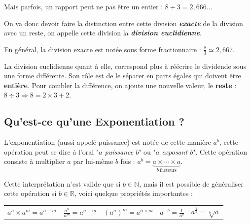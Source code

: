 \documentclass[a4paper, twoside]{article}
\begin{document}
			Mais parfois, un rapport peut ne pas être un entier : $ 8 \div 3 = 2,666...$
			
			On va donc devoir faire la distinction entre cette division
			\textit{\textbf{exacte}} de la division avec un reste, 
			on appelle cette division la \textbf{\textit{division euclidienne}}.
			
			En général, la division exacte est notée sous forme fractionnaire : $\frac{8}{3} \simeq 2,667$.
			
			La division euclidienne quant à elle, correspond plus à réécrire le dividende sous une forme différente. 
			Son rôle est de le séparer en parts égales qui doivent être \textbf{entière}. 
			Pour combler la différence, on ajoute une nouvelle valeur, 
			le \textbf{reste} : $ 8 \div 3 \Longrightarrow 8 = 2 \times 3 + 2$.

			\vspace{5 mm}

		\subsection*{Qu'est-ce qu'une Exponentiation ?}

			L'exponentiation (aussi appelé puissance) est notée de cette manière $a^b$, 
			cette opération peut se dire à l'oral "\textit{$a$ puissance $b$}" ou "\textit{$a$ exposant $b$}". 
			Cette opération consiste à multiplier $a$ par lui-même $b$ fois : 
			$a^b = \underbrace {a\times \cdots \times a} _{b\ \mathrm {facteurs}}$.

			\vspace{2 mm}

			Cette interprétation n'est valide que si $b \in \mathbb{N}$, 
			mais il est possible de généraliser cette opération si $b \in \mathbb{R}$, 
			voici quelque propriétés importantes :

			\vspace{-1 mm}

			\begin{Large}
				\begin{center}
					\begin{tabular}{c||c||c||c||c}

						$a^n \times a^m = a^{n+m}$ & 
						$\frac{a^n}{a^m} = a^{n-m}$ & 
						$ (a^n)^m = a^{n\times m}$ &
						$ a^{-b} = \frac{1}{a^b}$ & 
						$a^{\frac{1}{b}} = \sqrt[b]{a}$\\

					\end{tabular}
				\end{center}
			\end{Large}
\end{document}
